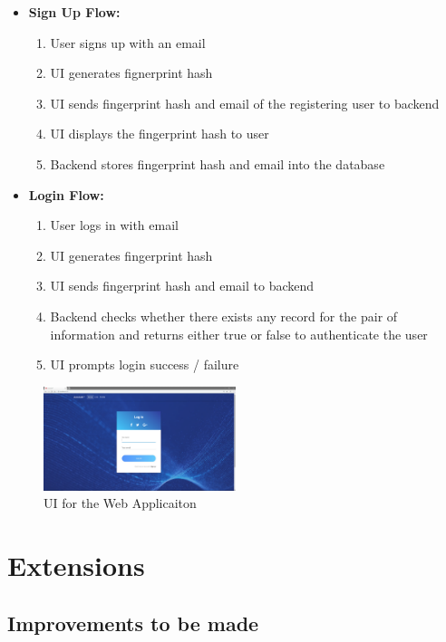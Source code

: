 \documentclass{acm_proc_article-sp}
\begin{document}
\begin{itemize}
    \item \textbf{Sign Up Flow:}
        \begin{enumerate}
        \item User signs up with an email  
        \item UI generates fignerprint hash  
        \item UI sends fingerprint hash and email of the registering user to backend  
        \item UI displays the fingerprint hash to user  
        \item Backend stores fingerprint hash and email into the database  
        \end{enumerate}

    \item \textbf{Login Flow:}
        \begin{enumerate}
        \item User logs in with email  
        \item UI generates fingerprint hash  
        \item UI sends fingerprint hash and email to backend  
        \item Backend checks whether there exists any record for the pair of information and returns either true or false to authenticate the user  
        \item UI prompts login success / failure  
\end{enumerate}
\end{itemize}

\begin{figure}[h]
    \centering
    \includegraphics[width=0.5\textwidth]{assets/ui.png}
    \caption{UI for the Web Applicaiton}
    \label{fig:ui}
\end{figure}

\section{Extensions}

\subsection{Improvements to be made}
\end{document}
